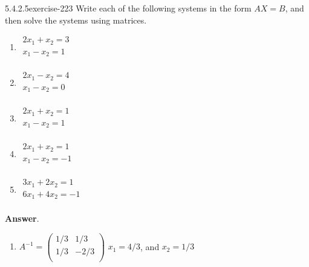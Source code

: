 \documentclass[twoside,10pt,]{book}
\numberwithin{equation}{section}
\begin{document}
\begin{divisionsolution}{5.4.2.5}{}{exercise-223}%
\hypertarget{p-1917}{}%
Write each of the following systems in the form \(A X = B\), and then solve the systems using matrices.%
\par
\hypertarget{p-1918}{}%
\leavevmode%
\begin{multicols}{2}
\begin{enumerate}[label=(\alph*)]
\item\hypertarget{li-1023}{}\hypertarget{p-1919}{}%
\(\begin{array}{c}2x_1+x_2=3\\
x_1-x_2= 1\\
\end{array}\)%
\item\hypertarget{li-1024}{}\hypertarget{p-1920}{}%
\(\begin{array}{c}2x_1-x_2=4\\
x_1 -x_2= 0\\
\end{array}\)%
\item\hypertarget{li-1025}{}\(\begin{array}{c}2x_1+x_2=1\\
x_1 -x_2= 1\\
\end{array}\)%
\item\hypertarget{li-1026}{}\hypertarget{p-1921}{}%
\(\begin{array}{c}2x_1+x_2=1\\
x_1 -x_2= -1\\
\end{array}\)%
\item\hypertarget{li-1027}{}\hypertarget{p-1922}{}%
\(\begin{array}{c}3x_1+2x_2=1 \\
6 x_1 +4x_2= -1\\
\end{array}\)%
\end{enumerate}
\end{multicols}
%
\par\smallskip%
\noindent\textbf{Answer}.\quad%
\hypertarget{p-1923}{}%
\leavevmode%
\begin{enumerate}[label=(\alph*)]
\item\hypertarget{li-1028}{}\(A^{-1}=\left(
\begin{array}{cc}
1/3 & 1/3 \\
1/3 & -2/3 \\
\end{array}
\right)\)  \(x_1=4/3\), and \(x_2=1/3\)%

\end{enumerate}
\end{divisionsolution}
\end{document}
